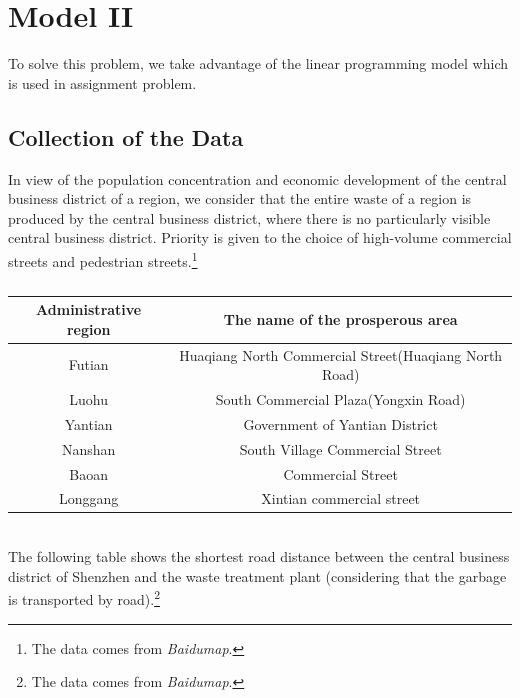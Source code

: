 \documentclass[UTF8]{article}
\begin{document}
\section{Model II}
\indent To solve this problem, we take advantage of the linear programming model which is used in assignment problem.
\subsection{Collection of the Data}
\indent In view of the population concentration and economic development of the central business district of a region, we consider that the entire waste of a region is produced by the central business district, where there is no particularly visible central business district. Priority is given to the choice of high-volume commercial streets and pedestrian streets.\footnote{The data comes from \textit{Baidumap}.}\\
\begin{table}[h]
\caption{}
\begin{center}
\begin{tabular}{cc}
\hline
Administrative region&The name of the prosperous area\\
\hline
Futian&Huaqiang North Commercial Street(Huaqiang North Road)\\
\hline
Luohu&South Commercial Plaza(Yongxin Road)\\
\hline
Yantian&Government of Yantian District\\
\hline
Nanshan&South Village Commercial Street\\
\hline
Baoan&Commercial Street\\
\hline
Longgang&Xintian commercial street\\
\hline
\end{tabular}
\end{center}
\end{table}\\
\indent The following table shows the shortest road distance between the central business district of Shenzhen and the waste treatment plant (considering that the garbage is transported by road).\footnote{The data comes from \textit{Baidumap}.}\\
\end{document}
